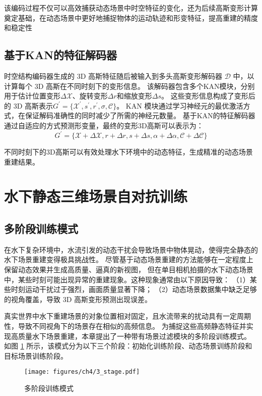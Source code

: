 该编码过程不仅可以高效捕获动态场景中时空特征的变化，还为后续高斯变形计算奠定基础，在动态场景中更好地捕捉物体的运动轨迹和形变特征，提高重建的精度和稳定性

\subsection{基于KAN的特征解码器}
时空结构编码器生成的 3D 高斯特征随后被输入到多头高斯变形解码器 $\mathcal{D}$ 中，以计算每个 3D 高斯在不同时刻下的变形信息。
该解码器包含多个KAN模块，分别用于估计位置变形$\Delta \mathcal{X}$、旋转变形$\Delta r$和缩放变形$\Delta s$。
这些变形信息构成了变形后的 3D 高斯表示$G^\prime=\{\mathcal{X}^\prime, s^\prime, r^\prime, \sigma, \mathcal{C} \}$。
KAN 模块通过学习神经元的最优激活方式，在保证解码准确性的同时减少了所需的神经元数量。
基于KAN的特征解码器通过自适应的方式预测形变量，最终的变形3D高斯可以表示为：
\begin{equation}
    G^\prime = \{ \mathcal{X} + \Delta \mathcal{X}, r + \Delta r, s + \Delta s, \alpha + \Delta \alpha, \mathcal{C} + \Delta \mathcal{C} \}
\end{equation}

不同时刻下的3D高斯可以有效处理水下环境中的动态特征，生成精准的动态场景重建结果。

\section{水下静态三维场景自对抗训练}
\subsection{多阶段训练模式}
在水下复杂环境中，水流引发的动态干扰会导致场景中物体晃动，使得完全静态的水下场景重建变得极具挑战性。
尽管基于动态场景重建的方法能够在一定程度上保留动态效果并生成高质量、逼真的新视图，
但在单目相机拍摄的水下动态场景中，某些时刻可能出现异常的重建现象。这种现象通常由以下原因导致：
（1）某些时刻运动干扰过于强烈，画面质量显著下降；
（2）动态场景数据集中缺乏足够的视角覆盖，导致 3D 高斯变形预测出现误差。

真实世界中水下重建场景的对象位置相对固定，且水流带来的扰动具有一定周期性，导致不同视角下的场景存在相似的高频信息。
为捕捉这些高频静态特征并实现高质量水下场景重建，本章提出了一种带有场景过滤模块的多阶段训练模式。
如图 \ref{img:3_stage} 所示，该模式分为以下三个阶段：初始化训练阶段、动态场景训练阶段和目标场景训练阶段。
\begin{figure}[htbp]
    \centering
    \texttt{[image: figures/ch4/3\_stage.pdf]}
    \caption{多阶段训练模式}
    \label{img:3_stage}
\end{figure}

